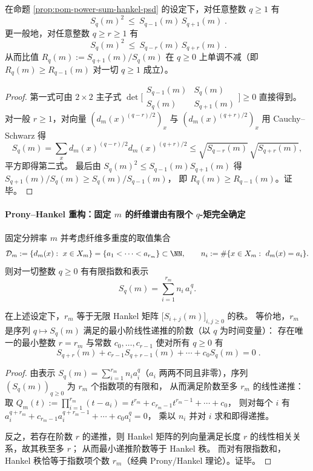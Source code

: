 \begin{corollary}[跨 \(q\) 的离散对数凸性链与比值单调性]\label{cor:pom-crossq-logconvex-chain}
在命题 \ref{prop:pom-power-sum-hankel-psd} 的设定下，对任意整数 \(q\ge 1\) 有
\[
\boxed{\;
S_q(m)^2\ \le\ S_{q-1}(m)\,S_{q+1}(m)\; }.
\]
更一般地，对任意整数 \(q\ge r\ge 1\) 有
\[
\boxed{\;
S_q(m)^2\ \le\ S_{q-r}(m)\,S_{q+r}(m)\; }.
\]
从而比值
\(
R_q(m):=S_{q+1}(m)/S_q(m)
\)
在 \(q\ge 0\) 上单调不减（即 \(R_{q}(m)\ge R_{q-1}(m)\) 对一切 \(q\ge 1\) 成立）。
\end{corollary}
\begin{proof}
第一式可由 \(2\times 2\) 主子式 \(\det\bigl[\begin{smallmatrix}S_{q-1}(m)&S_q(m)\\ S_q(m)&S_{q+1}(m)\end{smallmatrix}\bigr]\ge 0\) 直接得到。
对一般 \(r\ge 1\)，对向量 \((d_m(x)^{(q-r)/2})_x\) 与 \((d_m(x)^{(q+r)/2})_x\) 用 Cauchy--Schwarz 得
\[
S_q(m)=\sum_x d_m(x)^{(q-r)/2}d_m(x)^{(q+r)/2}
\le \sqrt{S_{q-r}(m)}\,\sqrt{S_{q+r}(m)},
\]
平方即得第二式。
最后由 \(S_q(m)^2\le S_{q-1}(m)S_{q+1}(m)\) 得
\(
S_{q+1}(m)/S_q(m)\ge S_q(m)/S_{q-1}(m)
\)，
即 \(R_q(m)\ge R_{q-1}(m)\)。证毕。
\end{proof}

\paragraph{Prony--Hankel 重构：固定 \(m\) 的纤维谱由有限个 \(q\)-矩完全确定}
固定分辨率 \(m\) 并考虑纤维多重度的取值集合
\[
\mathcal{D}_m:=\{d_m(x):\ x\in X_m\}=\{a_1<\cdots<a_{r_m}\}\subset\NN,
\qquad
n_i:=\#\{x\in X_m:\ d_m(x)=a_i\}.
\]
则对一切整数 \(q\ge 0\) 有有限指数和表示
\[
S_q(m)=\sum_{i=1}^{r_m} n_i\,a_i^{\,q}.
\]

\begin{theorem}\label{thm:pom-fiber-spectrum-prony-hankel-rank}
在上述设定下，\(r_m\) 等于无限 Hankel 矩阵 \(\bigl[S_{i+j}(m)\bigr]_{i,j\ge 0}\) 的秩。
等价地，\(r_m\) 是序列 \(q\mapsto S_q(m)\) 满足的最小阶线性递推的阶数（以 \(q\) 为时间变量）：
存在唯一的最小整数 \(r=r_m\) 与常数 \(c_0,\dots,c_{r-1}\) 使对所有 \(q\ge 0\) 有
\[
\boxed{\;
S_{q+r}(m)+c_{r-1}S_{q+r-1}(m)+\cdots+c_0 S_q(m)=0\; }.
\]
\end{theorem}
\begin{proof}
由表示 \(S_q(m)=\sum_{i=1}^{r_m}n_i a_i^q\)（\(a_i\) 两两不同且非零），序列 \((S_q(m))_{q\ge 0}\) 为 \(r_m\) 个指数项的有限和，
从而满足阶数至多 \(r_m\) 的线性递推：取
\(
Q_m(t):=\prod_{i=1}^{r_m}(t-a_i)=t^{r_m}+c_{r_m-1}t^{r_m-1}+\cdots+c_0
\)，
则对每个 \(i\) 有 \(a_i^{q+r_m}+c_{r_m-1}a_i^{q+r_m-1}+\cdots+c_0 a_i^q=0\)，
乘以 \(n_i\) 并对 \(i\) 求和即得递推。
\par
反之，若存在阶数 \(r\) 的递推，则 Hankel 矩阵的列向量满足长度 \(r\) 的线性相关关系，故其秩至多 \(r\)；
从而最小递推阶数等于 Hankel 秩。
而对有限指数和，Hankel 秩恰等于指数项个数 \(r_m\)（经典 Prony/Hankel 理论）。证毕。
\end{proof}

